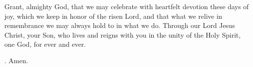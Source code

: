 \lettrine[lines=3]{G}{}rant, almighty God,
that we may celebrate with heartfelt devotion these days of joy,
which we keep in honor of the risen Lord,
and that what we relive in remembrance
we may always hold to in what we do.
Through our Lord Jesus Christ, your Son,
who lives and reigns with you in the unity of the Holy Spirit,
one God, for ever and ever.
\par \Rbar. Amen.
